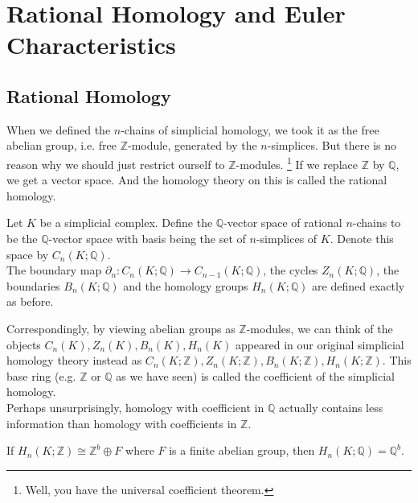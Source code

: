 \section{Rational Homology and Euler Characteristics}
\subsection{Rational Homology}
When we defined the $n$-chains of simplicial homology, we took it as the free abelian group, i.e. free $\mathbb Z$-module, generated by the $n$-simplices.
But there is no reason why we should just restrict ourself to $\mathbb Z$-modules.
\footnote{Well, you have the universal coefficient theorem.}
If we replace $\mathbb Z$ by $\mathbb Q$, we get a vector space.
And the homology theory on this is called the rational homology.
\begin{definition}
    Let $K$ be a simplicial complex.
    Define the $\mathbb Q$-vector space of rational $n$-chains to be the $\mathbb Q$-vector space with basis being the set of $n$-simplices of $K$.
    Denote this space by $C_n(K;\mathbb Q)$.\\
    The boundary map $\partial_n:C_n(K;\mathbb Q)\to C_{n-1}(K;\mathbb Q)$, the cycles $Z_n(K;\mathbb Q)$, the boundaries $B_n(K;\mathbb Q)$ and the homology groups $H_n(K;\mathbb Q)$ are defined exactly as before.
\end{definition}
Correspondingly, by viewing abelian groups as $\mathbb Z$-modules, we can think of the objects $C_n(K),Z_n(K),B_n(K),H_n(K)$ appeared in our original simplicial homology theory instead as $C_n(K;\mathbb Z),Z_n(K;\mathbb Z),B_n(K;\mathbb Z),H_n(K;\mathbb Z)$.
This base ring (e.g. $\mathbb Z$ or $\mathbb Q$ as we have seen) is called the coefficient of the simplicial homology.\\
Perhaps unsurprisingly, homology with coefficient in $\mathbb Q$ actually contains less information than homology with coefficients in $\mathbb Z$.
\begin{lemma}
    If $H_n(K;\mathbb Z)\cong\mathbb Z^b\oplus F$ where $F$ is a finite abelian group, then $H_n(K;\mathbb Q)=\mathbb Q^b$.
\end{lemma}
